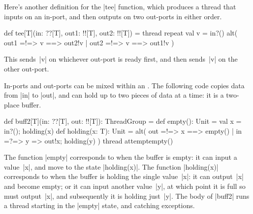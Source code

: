 Here's another definition for the |tee| function, which produces a thread that
inputs on an in-port, and then outputs on two out-ports in either order.
%
\begin{scala}
  def tee[T](in: ??[T], out1: !![T], out2: !![T]) = thread{
    repeat{ 
      val v = in?()
      alt( out1 =!=> { v } ==> { out2!v }
         | out2 =!=> { v } ==> { out1!v } 
      )
    }
  }
\end{scala}
%
This sends~|v| on whichever out-port is ready first, and then sends~|v| on the
other out-port.


In-ports and out-ports can be mixed within an .
%
The following code copies data from |in| to |out|, and can hold up to two
pieces of data at a time: it is a two-place buffer. 
%
\begin{scala}  
  def buff2[T](in: ??[T], out: !![T]): ThreadGroup = {
    def empty(): Unit = { val x = in?(); holding(x) }
    def holding(x: T): Unit = {
      alt( out =!=> { x } ==> { empty() } 
         | in =?=> { y => out!x; holding(y) } )
    }
    thread{ attempt{empty()}{} }
  }
\end{scala}
%
The function |empty| corresponds to when the buffer is empty: it can input a
value~|x|, and move to the state |holding(x)|.  The function |holding(x)|
corresponds to when the buffer is holding the single value~|x|: it can
output~|x| and become empty; or it can input another value~|y|, at which point
it is full so must output~|x|, and subsequently it is holding just~|y|.  The
body of |buff2| runs a thread starting in the |empty| state, and catching
exceptions. 



